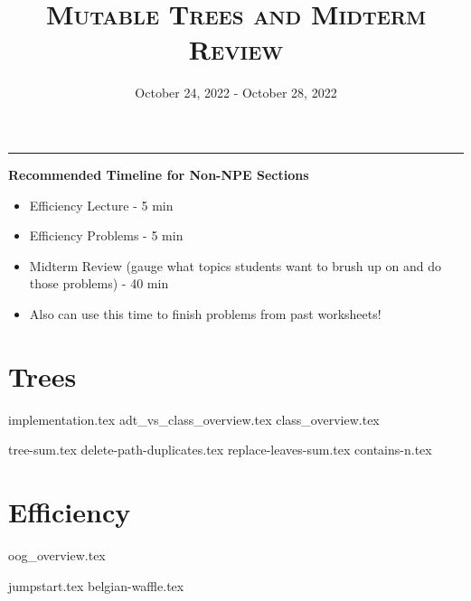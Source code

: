 \documentclass{exam}
\title{\textsc{Mutable Trees and Midterm Review}}
\date{October 24, 2022 - October 28, 2022}
\begin{document}
\maketitle
\rule{\textwidth}{0.15em}
\fontsize{12}{15}\selectfont

\begin{guide}
    \textbf{Recommended Timeline for Non-NPE Sections}
    \begin{itemize}
        \item Efficiency Lecture - 5 min
        \item Efficiency Problems - 5 min
        \item Midterm Review (gauge what topics students want to brush up on and do those problems) - 40 min
        \item Also can use this time to finish problems from past worksheets!
    \end{itemize}
\end{guide}

\section{Trees}
{implementation.tex}
{adt_vs_class_overview.tex}
{class_overview.tex}
\begin{questions}
    {tree-sum.tex}
    \newpage
    {delete-path-duplicates.tex}
    \newpage
    {replace-leaves-sum.tex}
    {contains-n.tex}
\end{questions}

\section{Efficiency}
{oog_overview.tex}
\begin{questions}
    {jumpstart.tex}
    {belgian-waffle.tex}
\end{questions}

\newpage
\end{document}
